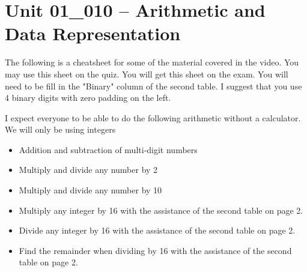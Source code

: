 \documentclass[letterpaper,12pt]{exam}
\newcommand{\unit}{Unit 01}
\begin{document}
\section*{\unit\_010 -- Arithmetic and Data Representation}
The following is a cheatsheet for some of the material covered in the video.  You may use this sheet on the quiz.
You will get this sheet on the exam.  You will need to be fill in the "Binary" column of the second table.  I suggest that you use 4 binary digits with zero padding on the left.

I expect everyone to be able to do the following arithmetic without a calculator.  We will only be using integers
\begin{itemize}
    \item Addition and subtraction of multi-digit numbers
    \item Multiply and divide any number by 2
    \item Multiply and divide any number by 10
    \item Multiply any integer by 16 with the assistance of the second table on page 2.
    \item Divide any integer by 16 with the assistance of the second table on page 2.
    \item Find the remainder when dividing by 16 with the assistance of the second table on page 2. 
\end{itemize}
\end{document}
